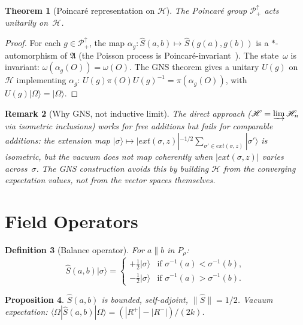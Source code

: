 \documentclass[11pt]{article}
\newtheorem{theorem}{Theorem}[section]
\newtheorem{proposition}[theorem]{Proposition}
\newtheorem{definition}[theorem]{Definition}
\newtheorem{remark}[theorem]{Remark}
\newcommand{\hilb}{\mathscr{H}}
\begin{document}
\begin{theorem}[Poincar\'e representation on $\hilb$]
\label{thm:poincare-limit}
The Poincar\'e group $\mathcal{P}^\uparrow_+$ acts unitarily
on~$\hilb$.
\end{theorem}

\begin{proof}
For each $g \in \mathcal{P}^\uparrow_+$, the map
$\alpha_g : \hat{S}(a,b) \mapsto \hat{S}(g(a), g(b))$ is
a $*$-automorphism of $\mathfrak{A}$ (the Poisson process
is Poincar\'e-invariant~\cite{BLMS87}).  The state~$\omega$
is invariant: $\omega(\alpha_g(O)) = \omega(O)$.
The GNS theorem gives a unitary $U(g)$ on $\hilb$
implementing $\alpha_g$:
$U(g) \pi(O) U(g)^{-1} = \pi(\alpha_g(O))$,
with $U(g)|\Omega\rangle = |\Omega\rangle$.
\end{proof}

\begin{remark}[Why GNS, not inductive limit]
\label{rem:gns-vs-lim}
The direct approach ($\hilb = \varinjlim \hilb_n$ via
isometric inclusions) works for free additions but fails
for comparable additions: the extension map
$|\sigma\rangle \mapsto |ext(\sigma,z)|^{-1/2}
\sum_{\sigma' \in ext(\sigma,z)} |\sigma'\rangle$
is isometric, but the vacuum does not map coherently when
$|ext(\sigma,z)|$ varies across~$\sigma$.  The GNS
construction avoids this by building $\hilb$ from the
\emph{converging expectation values}, not from the vector
spaces themselves.
\end{remark}

\section{Field Operators}
\label{sec:field}

\begin{definition}[Balance operator]
For $a \parallel b$ in $P_\rho$:
\[
  \hat{S}(a,b) |\sigma\rangle =
  \begin{cases}
    +\tfrac{1}{2} |\sigma\rangle
    & \text{if } \sigma^{-1}(a) < \sigma^{-1}(b), \\
    -\tfrac{1}{2} |\sigma\rangle
    & \text{if } \sigma^{-1}(a) > \sigma^{-1}(b).
  \end{cases}
\]
\end{definition}

\begin{proposition}
$\hat{S}(a,b)$ is bounded, self-adjoint, $\|\hat{S}\| = 1/2$.
Vacuum expectation:
$\langle\Omega|\hat{S}(a,b)|\Omega\rangle
= (|R^+| - |R^-|)/(2k)$.
\end{proposition}
\end{document}
